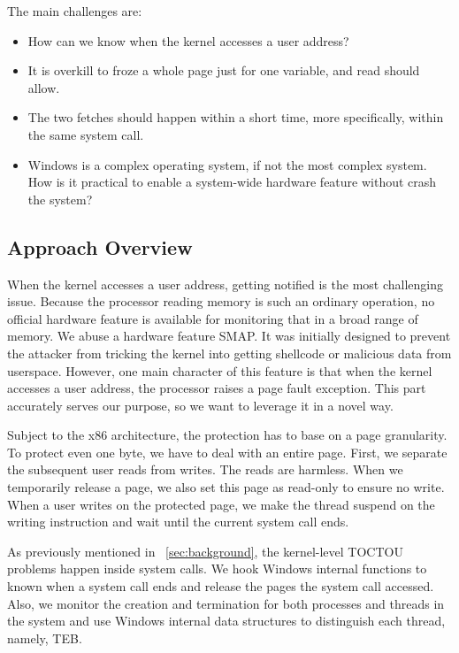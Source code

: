 The main challenges are:

\begin{itemize}
	\item How can we know when the kernel accesses a user address?
	\item It is overkill to froze a whole page just for one variable, and read should allow.
	\item The two fetches should happen within a short time, more specifically, within the same system call. 
	\item Windows is a complex operating system, if not the most complex system. How is it practical to enable a system-wide hardware feature without crash the system?
\end{itemize}


\subsection{Approach Overview}

When the kernel accesses a user address, getting notified is the most challenging issue. Because the processor reading memory is such an ordinary operation, no official hardware feature is available for monitoring that in a broad range of memory. We abuse a hardware feature SMAP. It was initially designed to prevent the attacker from tricking the kernel into getting shellcode or malicious data from userspace. However, one main character of this feature is that when the kernel accesses a user address, the processor raises a page fault exception. This part accurately serves our purpose, so we want to leverage it in a novel way.

Subject to the x86 architecture, the protection has to base on a page granularity. To protect even one byte, we have to deal with an entire page.
First, we separate the subsequent user reads from writes. The reads are harmless.  When we temporarily release a page, we also set this page as read-only to ensure no write. When a user writes on the protected page, we make the thread suspend on the writing instruction and wait until the current system call ends.

As previously mentioned in ~\autoref{sec:background}, the kernel-level TOCTOU problems happen inside system calls. We hook Windows internal functions to known when a system call ends and release the pages the system call accessed. Also, we monitor the creation and termination for both processes and threads in the system and use Windows internal data structures to distinguish each thread, namely, TEB.

